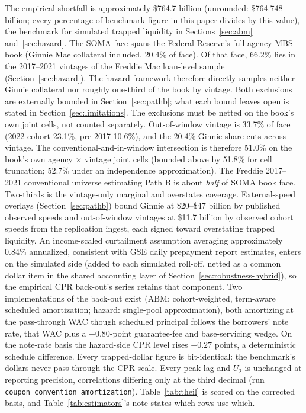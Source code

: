 \documentclass[12pt]{article}
\begin{document}
The empirical shortfall is approximately \$764.7 billion (unrounded: \$764.748 billion; every percentage-of-benchmark figure in this paper divides by this value), the benchmark for simulated trapped liquidity in Sections~\ref{sec:abm} and~\ref{sec:hazard}. The SOMA face spans the Federal Reserve's full agency MBS book (Ginnie Mae collateral included, 20.4\% of face). Of that face, 66.2\% lies in the 2017--2021 vintages of the Freddie Mac loan-level sample (Section~\ref{sec:hazard}). The hazard framework therefore directly samples neither Ginnie collateral nor roughly one-third of the book by vintage. Both exclusions are externally bounded in Section~\ref{sec:pathb}; what each bound leaves open is stated in Section~\ref{sec:limitations}. The exclusions must be netted on the book's own joint cells, not counted separately. Out-of-window vintage is 33.7\% of face (2022 cohort 23.1\%, pre-2017 10.6\%), and the 20.4\% Ginnie share cuts across vintage. The conventional-and-in-window intersection is therefore 51.0\% on the book's own agency $\times$ vintage joint cells (bounded above by 51.8\% for cell truncation; 52.7\% under an independence approximation). The Freddie 2017--2021 conventional universe estimating Path B is about \emph{half} of SOMA book face. Two-thirds is the vintage-only marginal and overstates coverage. External-speed overlays (Section~\ref{sec:pathb}) bound Ginnie at \$20--\$47 billion by published observed speeds and out-of-window vintages at \$11.7 billion by observed cohort speeds from the replication ingest, each signed toward overstating trapped liquidity. An income-scaled curtailment assumption averaging approximately 0.84\% annualized, consistent with GSE daily prepayment report estimates, enters on the simulated side (added to each simulated roll-off, netted as a common dollar item in the shared accounting layer of Section~\ref{sec:robustness-hybrid}), so the empirical CPR back-out's series retains that component. Two implementations of the back-out exist (ABM: cohort-weighted, term-aware scheduled amortization; hazard: single-pool approximation), both amortizing at the pass-through WAC though scheduled principal follows the borrowers' note rate, that WAC plus a $+0.80$-point guarantee-fee and base-servicing wedge. On the note-rate basis the hazard-side CPR level rises $+0.27$ points, a deterministic schedule difference. Every trapped-dollar figure is bit-identical: the benchmark's dollars never pass through the CPR scale. Every peak lag and $U_2$ is unchanged at reporting precision, correlations differing only at the third decimal (run \texttt{coupon\_convention\_amortization}). Table~\ref{tab:theil} is scored on the corrected basis, and Table~\ref{tab:estimators}'s note states which rows use which.
\end{document}
